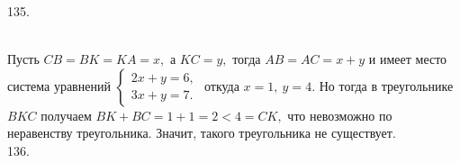 \documentclass[12pt]{article}
\begin{document}
135. \begin{figure}[ht!]
\end{figure}\\
Пусть $CB=BK=KA=x,$ а $KC=y,$ тогда $AB=AC=x+y$ и имеет место система уравнений $\begin{cases} 2x+y=6,\\ 3x+y=7.\end{cases}$ откуда $x=1,\ y=4.$ Но тогда в треугольнике $BKC$ получаем $BK+BC=1+1=2<4=CK,$ что невозможно по неравенству треугольника. Значит, такого треугольника не существует.\\
136. \begin{figure}[ht!]
\end{figure}\\
\end{document}
